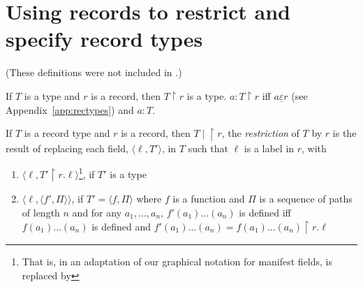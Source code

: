 


\section{Using records to restrict and specify record types}
\label{app:specrec}

(These definitions were not included in \citealp{Cooper2012}.)

If $T$ is a type and $r$ is a record, then $T\!\restriction\!r$ is a
type. $a:T\!\restriction\!r$ iff $a\underline{\varepsilon} r$ (see
Appendix~\ref{app:rectypes}) and $a:T$.

If $T$ is a record type and $r$ is a record, then $T\!\mid\!\restriction\! r$, the
\textit{restriction} of $T$ by
$r$ is the result
of replacing each field, $\langle \ell, T'\rangle$, in $T$ such that
$\ell$ is a label in $r$, with 
\begin{enumerate}
\item  $\langle\ell,T'\!\restriction\!r.\ell\rangle$\footnote{That is,
    in an adaptation of our
graphical notation for manifest fields,  is
replaced by }, if
$T'$ is a type
\item $\langle\ell,\langle f',\Pi\rangle\rangle$, if $T'=\langle
  f,\Pi\rangle$ where $f$ is a function and $\Pi$ is a sequence of
  paths of length $n$ and for any
  $a_1,\ldots,a_n$, $f'(a_1)\ldots(a_n)$ is defined iff
  $f(a_1)\ldots(a_n)$ is defined and $f'(a_1)\ldots(a_n) =
  f(a_1)\ldots(a_n)\!\restriction\!r.\ell$
\end{enumerate}


